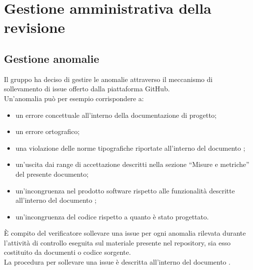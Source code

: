 
\section{Gestione amministrativa della revisione}
	\subsection{Gestione anomalie}
		Il gruppo ha deciso di gestire le anomalie attraverso il meccanismo di sollevamento di issue offerto dalla piattaforma GitHub.\\
		Un'anomalia può per esempio corrispondere a:
		\begin{itemize}
			\item un errore concettuale all'interno della documentazione di progetto;
			\item un errore ortografico;
			\item una violazione delle norme tipografiche riportate all'interno del documento ;
			\item un'uscita dai range di accettazione descritti nella sezione “Misure e metriche” del presente documento;
			\item un'incongruenza nel prodotto software rispetto alle funzionalità descritte all'interno del documento ;
			\item un'incongruenza del codice rispetto a quanto è stato progettato.
		\end{itemize}
		È compito del verificatore sollevare una issue per ogni anomalia rilevata durante l'attività di controllo eseguita sul materiale presente 
		nel repository, sia esso costituito da documenti o codice sorgente.\\
		La procedura per sollevare una issue è descritta all'interno del documento .